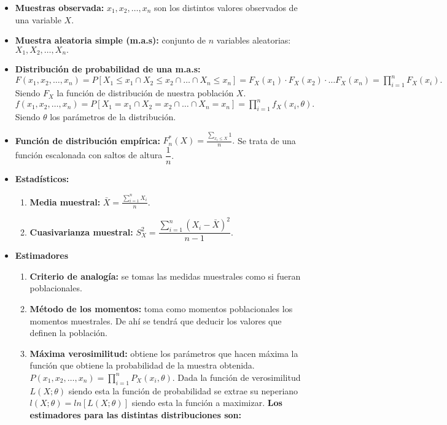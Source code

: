 \documentclass[a4paper, twocolumn, 10pt]{article}
\begin{document}
\begin{itemize}
	\item \textbf{Muestras observada:} $x_1, x_2, \ldots, x_n$ son los distintos valores observados de una variable $X.$
	\item \textbf{Muestra aleatoria simple (m.a.s):} conjunto de $n$ variables aleatorias: $X_1, X_2, \ldots, X_n.$
	\item \textbf{Distribución de probabilidad de una m.a.s:} $F(x_1, x_2, \ldots, x_n) = P\left[X_1\leq x_1 \cap X_2 \leq x_2 \cap \ldots \cap X_n \leq x_n\right] = F_X(x_1)\cdot F_X(x_2) \cdot \ldots F_X(x_n) = \displaystyle \prod\limits_{i=1}^{n}F_X(x_i).$ Siendo $F_X$ la función de distribución de nuestra población $X.$ $f(x_1, x_2, \ldots, x_n) = P\left[X_1= x_1 \cap X_2 = x_2 \cap \ldots \cap X_n = x_n\right] =  \displaystyle \prod\limits_{i=1}^{n}f_X(x_i, \theta).$ Siendo $\theta$ los parámetros de la distribución.
	\item \textbf{Función de distribución empírica:} $F_n^\ast(X) = \displaystyle \frac{\sum\limits_{x_i \leq X} 1}{n}.$ Se trata de una función escalonada con saltos de altura $\dfrac{1}{n}.$
	\item \textbf{Estadísticos:}
	\begin{enumerate}
		\item \textbf{Media muestral:} $\displaystyle \bar{X} = \frac{\sum\limits_{i=1}^{n}X_i}{n}.$
		\item \textbf{Cuasivarianza muestral:} $S^2_X = \dfrac{\sum\limits_{i=1}^{n}\left(X_i - \bar{X}\right)^2}{n - 1}.$
	\end{enumerate}
	\item \textbf{Estimadores}
	\begin{enumerate}
		\item \textbf{Criterio de analogía:} se tomas las medidas muestrales como si fueran poblacionales.
		\item \textbf{Método de los momentos:} toma como momentos poblacionales los momentos muestrales. De ahí se tendrá que deducir los valores que definen la población.
		\item \textbf{Máxima verosimilitud:} obtiene los parámetros que hacen máxima la función que obtiene la probabilidad de la muestra obtenida. $P(x_1, x_2, \ldots, x_n) = \displaystyle \prod\limits_{i=1}^{n}P_X(x_i, \theta).$ Dada la función de verosimilitud $L(X;\theta)$ siendo esta la función de probabilidad se extrae su neperiano $l(X;\theta) = ln\left[L(X;\theta)\right]$ siendo esta la función a maximizar. \textbf{Los estimadores para las distintas distribuciones son:}

\end{enumerate}
\end{itemize}
\end{document}
